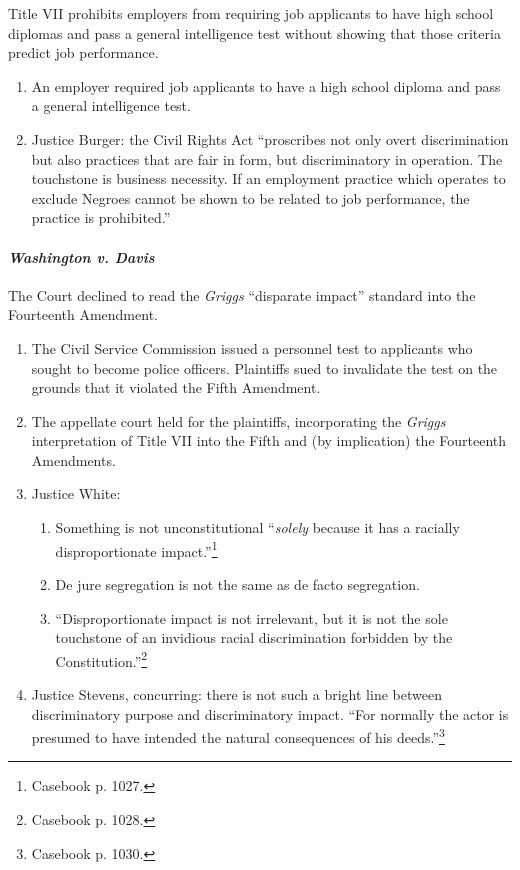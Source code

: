 Title VII prohibits employers from requiring job applicants to have high 
school diplomas and pass a general intelligence test without showing that 
those criteria predict job performance.

\begin{enumerate}
    \item An employer required job applicants to have a high school diploma 
    and pass a general intelligence test.
    \item Justice Burger: the Civil Rights Act ``proscribes not only overt 
    discrimination but also practices that are fair in form, but 
    discriminatory in operation. The touchstone is business necessity. If an 
    employment practice which operates to exclude Negroes cannot be shown to 
    be related to job performance, the practice is prohibited.''
\end{enumerate}

\paragraph{\emph{Washington v. Davis}}

The Court declined to read the \emph{Griggs} ``disparate impact'' standard 
into the Fourteenth Amendment.

\begin{enumerate}
    \item The Civil Service Commission issued a personnel test to applicants 
    who sought to become police officers. Plaintiffs sued to invalidate the 
    test on the grounds that it violated the Fifth Amendment.
    \item The appellate court held for the plaintiffs, incorporating the 
    \emph{Griggs} interpretation of Title VII into the Fifth and (by 
    implication) the Fourteenth Amendments.
    \item Justice White:
    \begin{enumerate}
        \item Something is not unconstitutional ``\emph{solely} because it has 
        a racially disproportionate impact.''\footnote{Casebook p. 1027.}
        \item De jure segregation is not the same as de facto segregation.
        \item ``Disproportionate impact is not irrelevant, but it is not the 
        sole touchstone of an invidious racial discrimination forbidden by the 
        Constitution.''\footnote{Casebook p. 1028.}
    \end{enumerate}
    \item Justice Stevens, concurring: there is not such a bright line between 
    discriminatory purpose and discriminatory impact. ``For normally the actor 
    is presumed to have intended the natural consequences of his 
    deeds.''\footnote{Casebook p. 1030.}
\end{enumerate}

